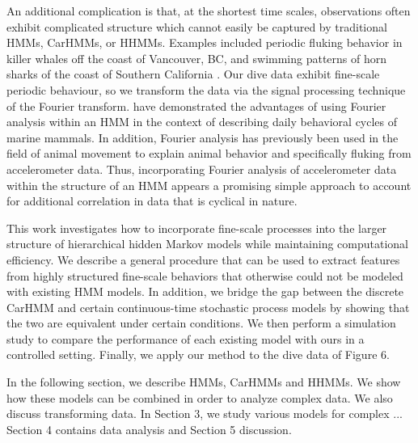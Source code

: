 An additional complication is that, at the shortest time scales,  observations often exhibit complicated  structure which cannot easily be captured by traditional HMMs, CarHMMs, or HHMMs. Examples included periodic fluking behavior in killer whales off the coast of Vancouver, BC, and swimming patterns of horn sharks of the coast of Southern California \citep{Adam:2019}. 
Our dive data exhibit  fine-scale periodic behaviour, so we transform the data via
 the signal processing technique of the Fourier transform. 
\cite{Heerah:2017} have demonstrated the advantages of using Fourier analysis within an HMM  in the context of describing daily behavioral cycles of marine mammals.
In addition, Fourier analysis has previously been used in the field of animal movement to explain animal behavior \citep{Fehlmann:2017} and specifically fluking \citep{Shorter:2017} from accelerometer data. 
Thus, incorporating Fourier analysis of accelerometer data within the structure of an HMM appears a promising simple approach to account for additional correlation in data that is cyclical in nature.

This work investigates how to incorporate fine-scale processes into the larger structure of hierarchical hidden Markov models while maintaining computational efficiency. 
We describe a general procedure that can be used to extract features from highly structured fine-scale behaviors that otherwise could not be modeled with existing HMM models. 
In addition, we bridge the gap between the discrete CarHMM and certain continuous-time stochastic process models by showing that the two are equivalent under certain conditions. 
We then perform a simulation study to compare the performance of each existing model with ours in a controlled setting. 
Finally, we apply our method to the dive data of Figure 6.

In the following section, we describe HMMs, CarHMMs and HHMMs.  We show how these models can be combined in order to analyze complex data. We also discuss transforming data.  In Section 3, we study various models for complex ...  Section 4 contains data analysis and Section 5 discussion.





